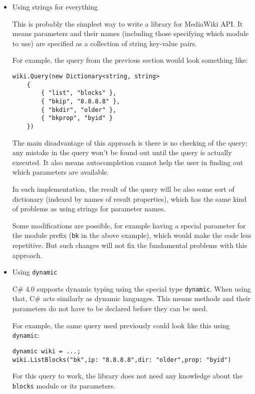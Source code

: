 \begin{itemize}
\item Using strings for everything

This is probably the simplest way to write a library for MediaWiki API.
It means parameters and their names (including those specifying which module to use) are specified
as a collection of string key-value pairs.

For example, the query from the previous section would look something like:

\begin{lstlisting}
wiki.Query(new Dictionary<string, string>
    {
        { "list", "blocks" },
        { "bkip", "8.8.8.8" },
        { "bkdir", "older" },
        { "bkprop", "byid" }
    })
\end{lstlisting}

The main disadvantage of this approach is there is no checking of the query:
any mistake in the query won't be found out until the query is actually executed.
It also means autocompletion cannot help the user in finding out which parameters are available.

In such implementation, the result of the query will be also some sort of dictionary
(indexed by names of result properties), which has the same kind of problems as using strings for parameter names.

Some modifications are possible, for example having a special parameter for the module prefix
(\texttt{bk} in the above example), which would make the code less repetitive.
But such changes will not fix the fundamental problems with this approach.

\item Using \lstinline{dynamic}

C\# 4.0 supports dynamic typing using the special type \lstinline{dynamic}.
When using that, C\# acts similarly as dynamic languages.
This means methods and their parameters do not have to be declared before they can be used.

For example, the same query used previously could look like this using \lstinline{dynamic}:

\begin{lstlisting}
dynamic wiki = ...;
wiki.ListBlocks("bk",ip: "8.8.8.8",dir: "older",prop: "byid")
\end{lstlisting}

For this query to work,
the library does not need any knowledge about the \texttt{blocks} module or its parameters.


\end{itemize}
